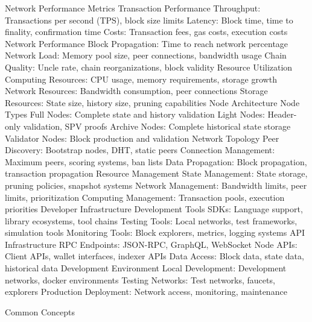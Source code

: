 \documentclass[
  letterpaper,
  DIV=11,
  numbers=noendperiod]{scrreprt}
\begin{document}
Network Performance Metrics Transaction Performance Throughput:
Transactions per second (TPS), block size limits Latency: Block time,
time to finality, confirmation time Costs: Transaction fees, gas costs,
execution costs Network Performance Block Propagation: Time to reach
network percentage Network Load: Memory pool size, peer connections,
bandwidth usage Chain Quality: Uncle rate, chain reorganizations, block
validity Resource Utilization Computing Resources: CPU usage, memory
requirements, storage growth Network Resources: Bandwidth consumption,
peer connections Storage Resources: State size, history size, pruning
capabilities Node Architecture Node Types Full Nodes: Complete state and
history validation Light Nodes: Header-only validation, SPV proofs
Archive Nodes: Complete historical state storage Validator Nodes: Block
production and validation Network Topology Peer Discovery: Bootstrap
nodes, DHT, static peers Connection Management: Maximum peers, scoring
systems, ban lists Data Propagation: Block propagation, transaction
propagation Resource Management State Management: State storage, pruning
policies, snapshot systems Network Management: Bandwidth limits, peer
limits, prioritization Computing Management: Transaction pools,
execution priorities Developer Infrastructure Development Tools SDKs:
Language support, library ecosystems, tool chains Testing Tools: Local
networks, test frameworks, simulation tools Monitoring Tools: Block
explorers, metrics, logging systems API Infrastructure RPC Endpoints:
JSON-RPC, GraphQL, WebSocket Node APIs: Client APIs, wallet interfaces,
indexer APIs Data Access: Block data, state data, historical data
Development Environment Local Development: Development networks, docker
environments Testing Networks: Test networks, faucets, explorers
Production Deployment: Network access, monitoring, maintenance

Common Concepts
\end{document}
